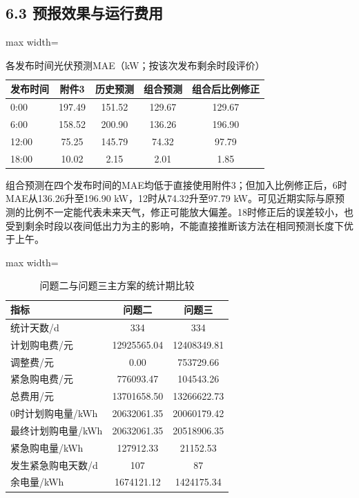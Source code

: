 \documentclass[UTF8,a4paper,zihao=-4,fontset=windows]{ctexart}
\begin{document}
\subsection{6.3 预报效果与运行费用}
\begin{table}[H]\centering\caption{各发布时间光伏预测MAE（kW；按该次发布剩余时段评价）}
\fontsize{9.5}{12}\selectfont\setlength{\tabcolsep}{4pt}\renewcommand{\arraystretch}{1.12}
\begin{adjustbox}{max width=\linewidth}\begin{tabular}{lcccc}\toprule
发布时间 & 附件3 & 历史预测 & 组合预测 & 组合后比例修正\\\midrule
0:00 & 197.49 & 151.52 & 129.67 & 129.67\\
6:00 & 158.52 & 200.90 & 136.26 & 196.90\\
12:00 & 75.25 & 145.79 & 74.32 & 97.79\\
18:00 & 10.02 & 2.15 & 2.01 & 1.85\\
\bottomrule\end{tabular}\end{adjustbox}\end{table}
组合预测在四个发布时间的MAE均低于直接使用附件3；但加入比例修正后，6时MAE从136.26升至196.90 kW，12时从74.32升至97.79 kW。可见近期实际与原预测的比例不一定能代表未来天气，修正可能放大偏差。18时修正后的误差较小，也受到剩余时段以夜间低出力为主的影响，不能直接推断该方法在相同预测长度下优于上午。
\par
\begin{table}[H]\centering\caption{问题二与问题三主方案的统计期比较}
\fontsize{9.5}{12}\selectfont\setlength{\tabcolsep}{4pt}\renewcommand{\arraystretch}{1.12}
\begin{adjustbox}{max width=\linewidth}\begin{tabular}{lcc}\toprule
指标 & 问题二 & 问题三\\\midrule
统计天数/d & 334 & 334\\
计划购电费/元 & 12925565.04 & 12408349.81\\
调整费/元 & 0.00 & 753729.66\\
紧急购电费/元 & 776093.47 & 104543.26\\
总费用/元 & 13701658.50 & 13266622.73\\
0时计划购电量/kWh & 20632061.35 & 20060179.42\\
最终计划购电量/kWh & 20632061.35 & 20518906.35\\
紧急购电量/kWh & 127912.33 & 21152.53\\
发生紧急购电天数/d & 107 & 87\\
余电量/kWh & 1674121.12 & 1424175.34\\
\bottomrule\end{tabular}\end{adjustbox}\end{table}
\end{document}
